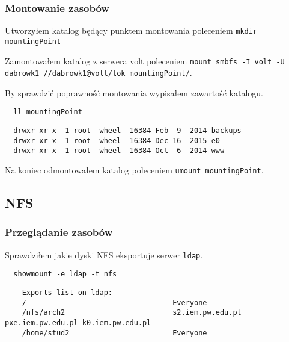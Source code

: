 \documentclass{article} %
\begin{document}
\subsubsection{Montowanie zasobów}
Utworzyłem katalog będący punktem montowania poleceniem \texttt{mkdir mountingPoint}

Zamontowałem katalog z serwera volt poleceniem \texttt{mount\_smbfs -I volt -U dabrowk1 //dabrowk1@volt/lok mountingPoint/}.

By sprawdzić poprawność montowania wypisałem zawartość katalogu.
\begin{tcolorbox}[colback=yellow!10!white,colframe=red!45!black,coltitle=yellow!100!black, title=FreeBSD]
  \begin{lstlisting}
  ll mountingPoint
  \end{lstlisting}
  \tcblower
  \tiny
  \begin{lstlisting}
  drwxr-xr-x  1 root  wheel  16384 Feb  9  2014 backups 
  drwxr-xr-x  1 root  wheel  16384 Dec 16  2015 e0
  drwxr-xr-x  1 root  wheel  16384 Oct  6  2014 www
  \end{lstlisting}
\end{tcolorbox}
\normalsize
\vspace{5mm}

Na koniec odmontowałem katalog poleceniem \texttt{umount mountingPoint}.

\subsection{NFS}

\subsubsection{Przeglądanie zasobów}
Sprawdziłem jakie dyski NFS eksportuje serwer \texttt{ldap}.
\begin{tcolorbox}[colback=yellow!10!white,colframe=red!45!black,coltitle=yellow!100!black, title=FreeBSD]
  \begin{lstlisting}
  showmount -e ldap -t nfs
  \end{lstlisting}
  \tcblower
  \tiny
  \begin{lstlisting}
    Exports list on ldap:
    /                                  Everyone
    /nfs/arch2                         s2.iem.pw.edu.pl pxe.iem.pw.edu.pl k0.iem.pw.edu.pl  
    /home/stud2                        Everyone
  \end{lstlisting}
\end{tcolorbox}
\normalsize
\end{document}
